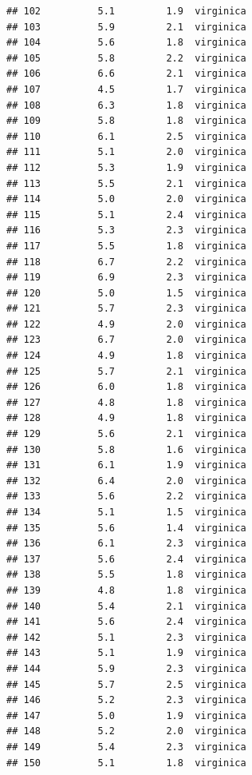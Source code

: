 \documentclass[krantz2]{krantz}\usepackage{knitr}%
\begin{document}
\begin{knitrout}
\begin{kframe}
\begin{verbatim}
## 102          5.1         1.9  virginica
## 103          5.9         2.1  virginica
## 104          5.6         1.8  virginica
## 105          5.8         2.2  virginica
## 106          6.6         2.1  virginica
## 107          4.5         1.7  virginica
## 108          6.3         1.8  virginica
## 109          5.8         1.8  virginica
## 110          6.1         2.5  virginica
## 111          5.1         2.0  virginica
## 112          5.3         1.9  virginica
## 113          5.5         2.1  virginica
## 114          5.0         2.0  virginica
## 115          5.1         2.4  virginica
## 116          5.3         2.3  virginica
## 117          5.5         1.8  virginica
## 118          6.7         2.2  virginica
## 119          6.9         2.3  virginica
## 120          5.0         1.5  virginica
## 121          5.7         2.3  virginica
## 122          4.9         2.0  virginica
## 123          6.7         2.0  virginica
## 124          4.9         1.8  virginica
## 125          5.7         2.1  virginica
## 126          6.0         1.8  virginica
## 127          4.8         1.8  virginica
## 128          4.9         1.8  virginica
## 129          5.6         2.1  virginica
## 130          5.8         1.6  virginica
## 131          6.1         1.9  virginica
## 132          6.4         2.0  virginica
## 133          5.6         2.2  virginica
## 134          5.1         1.5  virginica
## 135          5.6         1.4  virginica
## 136          6.1         2.3  virginica
## 137          5.6         2.4  virginica
## 138          5.5         1.8  virginica
## 139          4.8         1.8  virginica
## 140          5.4         2.1  virginica
## 141          5.6         2.4  virginica
## 142          5.1         2.3  virginica
## 143          5.1         1.9  virginica
## 144          5.9         2.3  virginica
## 145          5.7         2.5  virginica
## 146          5.2         2.3  virginica
## 147          5.0         1.9  virginica
## 148          5.2         2.0  virginica
## 149          5.4         2.3  virginica
## 150          5.1         1.8  virginica
\end{verbatim}
\end{kframe}
\end{knitrout}
\end{document}
